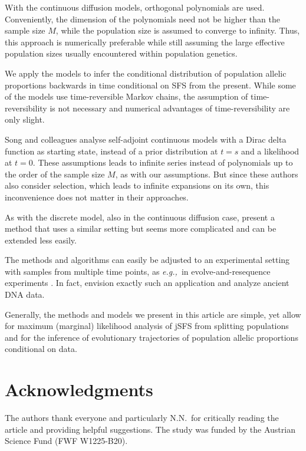 \documentclass[preprint]{elsarticle}
\newcommand\eg{{\it e.g.,}}
\begin{document}
With the continuous diffusion models, orthogonal polynomials are used. Conveniently, the dimension of the polynomials need not be higher than the sample size $M$, while the population size is assumed to converge to infinity. Thus, this approach is numerically preferable while still assuming the large effective population sizes usually encountered within population genetics. 

We apply the models to infer the conditional distribution of population allelic proportions backwards in time conditional on SFS from the present. While some of the models use time-reversible Markov chains, the assumption of time-reversibility is not necessary and numerical advantages of time-reversibility are only slight.

Song and colleagues \citep{Song12,Stei13,Stei14,Zivk15} analyse self-adjoint continuous models with a Dirac delta function as starting state, instead of a prior distribution at $t=s$ and a likelihood at $t=0$. These assumptions leads to infinite series instead of polynomials up to the order of the sample size $M$, as with our assumptions. But since these authors also consider selection, which leads to infinite expansions on its own, this inconvenience does not matter in their approaches. 

As with the discrete model, also in the continuous diffusion case, \citet{Zhao13} present a method that uses a similar setting but seems more complicated and can be extended less easily. 

The methods and algorithms can easily be adjusted to an experimental setting with samples from multiple time points, as \eg\ in evolve-and-resequence experiments \citep{Kofl14}. In fact, \citet{Stei14} envision exactly such an application and analyze ancient DNA data. 

Generally, the methods and models we present in this article are simple, yet allow for maximum (marginal) likelihood analysis of jSFS from splitting populations and for the inference of evolutionary trajectories of population allelic proportions conditional on data. 
 

\section*{Acknowledgments}

The authors thank everyone and particularly N.N.\ for critically reading the article and providing helpful suggestions. The study was funded by the Austrian Science Fund (FWF W1225-B20).
\end{document}

